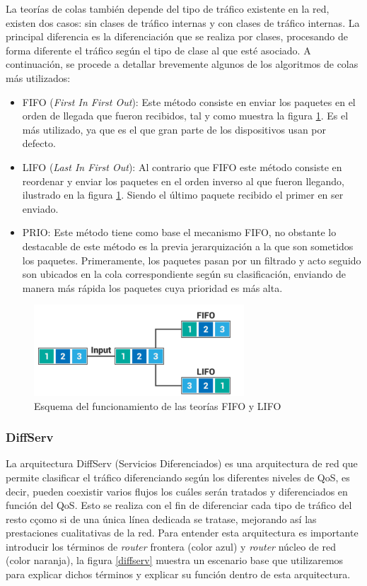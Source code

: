 	La teorías de colas también depende del tipo de tráfico existente en la red, existen dos casos: sin clases de tráfico internas y con clases de tráfico internas. La principal diferencia es la diferenciación que se realiza por clases, procesando de forma diferente el tráfico según el tipo de clase al que esté asociado. A continuación, se procede a detallar brevemente algunos de los algoritmos de colas más utilizados:
	
	\begin{itemize}
	    \item FIFO (\textit{First In First Out}): Este método consiste en enviar los paquetes en el orden de llegada que fueron recibidos, tal y como muestra la figura \ref{fifolifo}. Es el más utilizado, ya que es el que gran parte de los dispositivos usan por defecto.
	    \item LIFO (\textit{Last In First Out}): Al contrario que FIFO este método consiste en reordenar y enviar los paquetes en el orden inverso al que fueron llegando, ilustrado en la figura \ref{fifolifo}. Siendo el último paquete recibido el primer en ser enviado. 
	    \item PRIO: Este método tiene como base el mecanismo FIFO, no obstante lo destacable de este método es la previa jerarquización a la que son sometidos los paquetes. Primeramente, los paquetes pasan por un filtrado y acto seguido son ubicados en la cola correspondiente según su clasificación, enviando de manera más rápida los paquetes cuya prioridad es más alta. 
	\end{itemize}
	
	\begin{figure}[H]
			\centering
			\includegraphics[width=0.7\textwidth]{img/FIFO-LIFO.png}
			\caption{Esquema del funcionamiento de las teorías FIFO y LIFO}
			\label{fifolifo}
		\end{figure}

	\subsubsection{DiffServ} 
	La arquitectura DiffServ (Servicios Diferenciados) es una arquitectura de red que permite clasificar el tráfico diferenciando según los diferentes niveles de QoS, es decir, pueden coexistir varios flujos los cuáles serán tratados y diferenciados en función del QoS. Esto se realiza con el fin de diferenciar cada tipo de tráfico del resto cçomo si de una única línea dedicada se tratase, mejorando así las prestaciones cualitativas de la red. Para entender esta arquitectura es importante introducir los términos de \textit{router} frontera (color azul) y \textit{router} núcleo de red (color naranja), la figura \ref{diffserv} muestra un escenario base que utilizaremos para explicar dichos términos y explicar su función dentro de esta arquitectura.
	
